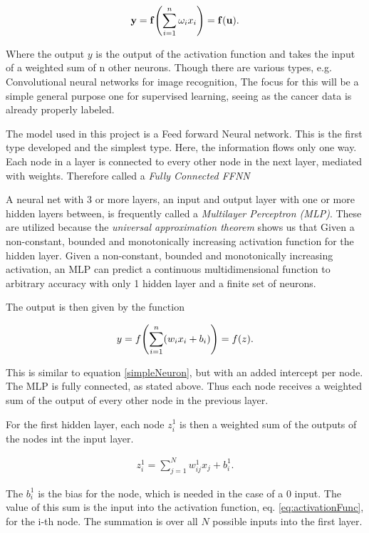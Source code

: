 \documentclass[10pt]{article}
\begin{document}
\begin{align}
	\mathbf{y} = \mathbf{f}\qty(\sum_{i=1}^n \omega_i x_i) = \mathbf{f}(\mathbf{u})
	\label{simpleNeuron}. 
\end{align}

Where the output $y$ is the output of the activation function and takes the
input of a weighted sum of n other neurons. Though there are various types,
e.g. Convolutional neural networks for image recognition, The focus for this
will be a simple general purpose one for supervised learning, seeing as the
cancer data is already properly labeled. 

The model used in this project is a Feed forward Neural network. This is the
first type developed and the simplest type. Here, the information flows only
one way. Each node in a layer is connected to every other node in the next
layer, mediated with weights. Therefore called a \emph{Fully Connected FFNN}

A neural net with 3 or more layers, an input and output layer with one or more
hidden layers between, is frequently called a \emph{Multilayer Perceptron
(MLP)}. These are utilized because the \emph{universal approximation theorem}
shows us that Given a non-constant, bounded and monotonically increasing
activation function for the hidden layer.  Given a non-constant, bounded and
monotonically increasing activation, an MLP can predict a continuous
multidimensional function to arbitrary accuracy with only 1 hidden layer and a
finite set of neurons.

The output is then given by the function 

\begin{align}
	y = f\qty(\sum_{i=1}^n(w_ix_i + b_i)) = f(z)
	\label{eq:activationFunc}.
\end{align}

This is similar to equation \ref{simpleNeuron}, but with an added intercept per
node. The MLP is fully connected, as stated above. Thus each node receives a
weighted sum of the output of every other node in the previous layer. 

For the first hidden layer, each node $z^1_i$ is then a weighted sum of the
outputs of the nodes int the input layer. 

\begin{align}
	z^1_i = \sum_{j=1}^N w^1_{ij}x_j + b_i^1
	\label{eq:nodeInput}.
\end{align}

The $b^1_i$ is the bias for the node, which is needed in the case of a 0 input.
The value of this sum is the input into the activation function, eq.
\ref{eq:activationFunc}, for the i-th node. The summation is over all $N$
possible inputs into the first layer.
\end{document}
